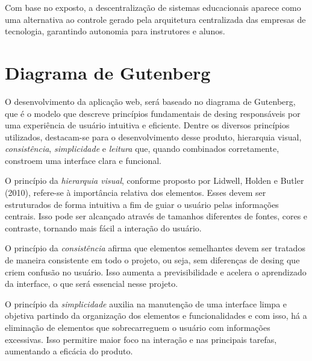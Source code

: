 Com base no exposto, a descentralização de sistemas educacionais aparece como uma alternativa ao controle gerado pela arquitetura centralizada das empresas de tecnologia, garantindo autonomia para instrutores e alunos.


\section{Diagrama de Gutenberg}

O desenvolvimento da aplicação web, será baseado no diagrama de Gutenberg, que é o modelo que descreve princípios fundamentais de desing responsáveis por uma experiência de usuário intuitiva e eficiente. Dentre os diversos princípios utilizados, destacam-se para o desenvolvimento desse produto, {hierarquia visual}, \textit{consistência}, \textit{simplicidade} e \textit{leitura} que, quando combinados corretamente, constroem uma interface clara e funcional.

O princípio da \textit{hierarquia visual}, conforme proposto por Lidwell, Holden e Butler (2010), refere-se à importância relativa dos elementos. Esses devem ser estruturados de forma intuitiva a fim de guiar o usuário pelas informações centrais. Isso pode ser alcançado através de tamanhos diferentes de fontes, cores  e contraste, tornando mais fácil a interação do usuário.

O princípio da \textit{consistência} afirma que elementos semelhantes devem ser tratados de maneira consistente em todo o projeto, ou seja, sem diferenças de desing que criem confusão no usuário. Isso aumenta a previsibilidade e acelera o aprendizado da interface, o que será essencial nesse projeto.

O princípio da \textit{simplicidade} auxilia na manutenção de uma interface limpa e objetiva partindo da organização dos elementos e funcionalidades e com isso, há a eliminação de elementos que sobrecarreguem o usuário com informações excessivas. Isso permitire maior foco na interação e nas principais tarefas, aumentando a eficácia do produto.

